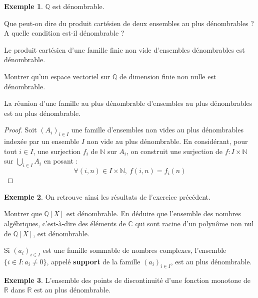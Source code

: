 \documentclass[french]{article}
\newcommand{\N}{\mathbb{N}}
\newcommand{\Q}{\mathbb{Q}}
\newcommand{\R}{\mathbb{R}}
\newcommand{\C}{\mathbb{C}}
\theoremstyle{plain}
\theoremstyle{definition}
\newtheorem*{ex}{Exemple}
\theoremstyle{remark}
\begin{document}
\begin{ex}
	$\Q$ est dénombrable.
\end{ex}

\begin{exo}
	Que peut-on dire du produit cartésien de deux ensembles au plus dénombrables ? A quelle condition est-il dénombrable ?
\end{exo}

\begin{cor}%
	Le produit cartésien d'une famille finie non vide d'ensembles dénombrables est dénombrable.
\end{cor}

\begin{exo}
	Montrer qu'un espace vectoriel sur $\Q$ de dimension finie non nulle est dénombrable.
\end{exo}

\begin{cor}%
	La réunion d'une famille au plus dénombrable d'ensembles au plus dénombrables est au plus dénombrable.
\end{cor}
\begin{proof}
	Soit $(A_i)_{i\in I}$ une famille d'ensembles non vides au plus dénombrables indexée par un ensemble $I$ non vide au plus dénombrable. En considérant, pour tout $i\in I$, une surjection $f_i$ de $\N$ sur $A_i$, on construit une surjection de $f:I\times\N$ sur $\displaystyle\bigcup_{i\in I}A_i$ en posant : $$\forall (i,n)\in I\times\N,\ f(i,n)=f_i(n)$$
\end{proof}

\begin{ex}
	On retrouve ainsi les résultats de l'exercice précédent.
\end{ex}

\begin{exo}
	Montrer que $\Q[X]$ est dénombrable. En déduire que l'ensemble des nombres algébriques, c'est-à-dire des éléments de $\C$ qui sont racine d'un polynôme non nul de $\Q[X]$, est dénombrable.
\end{exo}

\begin{prop}%
	Si $(a_i)_{i\in I}$ est une famille sommable de nombres complexes, l'ensemble $\{i\in I : a_i\ne 0\}$, appelé \textbf{support} de la famille $(a_i)_{i\in I}$, est au plus dénombrable.
\end{prop}

\begin{ex}
	L'ensemble des points de discontinuité d'une fonction monotone de $\R$ dans $\R$ est au plus dénombrable.
\end{ex}
\end{document}
